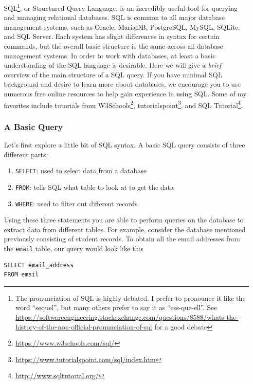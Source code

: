 \documentclass[
]{krantz}
\providecommand{\tightlist}{%
  \setlength{\itemsep}{0pt}\setlength{\parskip}{0pt}}
\renewcommand{\href}[2]{#2\footnote{\url{#1}}}
\begin{document}
SQL\footnote{The pronunciation of SQL is highly debated. I prefer to pronounce it like the word ``sequel'', but many others prefer to say it as ``ess-que-ell''. See \url{https://softwareengineering.stackexchange.com/questions/8588/whats-the-history-of-the-non-official-pronunciation-of-sql} for a good debate}, or Structured Query Language, is an incredibly useful tool for querying and managing relational databases. SQL is common to all major database management systems, such as Oracle, MariaDB, PostgreSQL, MySQL, SQLite, and SQL Server. Each system has slight differences in syntax for certain commands, but the overall basic structure is the same across all database management systems. In order to work with databases, at least a basic understanding of the SQL language is desirable. Here we will give a \emph{brief} overview of the main structure of a SQL query. If you have minimal SQL background and desire to learn more about databases, we encourage you to use numerous free online resources to help gain experience in using SQL. Some of my favorites include tutorials from \href{https://www.w3schools.com/sql/}{W3Schools}, \href{https://www.tutorialspoint.com/sql/index.htm}{tutorialspoint}, and \href{http://www.sqltutorial.org/}{SQL Tutorial}.

\hypertarget{a-basic-query}{%
\subsubsection{A Basic Query}\label{a-basic-query}}

Let's first explore a little bit of SQL syntax. A basic SQL query consists of three different parts:

\begin{enumerate}
\def\labelenumi{\arabic{enumi}.}
\tightlist
\item
  \texttt{SELECT}: used to select data from a database
\item
  \texttt{FROM}: tells SQL what table to look at to get the data
\item
  \texttt{WHERE}: used to filter out different records
\end{enumerate}

Using these three statements you are able to perform queries on the database to extract data from different tables. For example, consider the database mentioned previously consisting of student records. To obtain all the email addresses from the \texttt{email} table, our query would look like this

\begin{verbatim}
SELECT email_address
FROM email
\end{verbatim}
\end{document}
